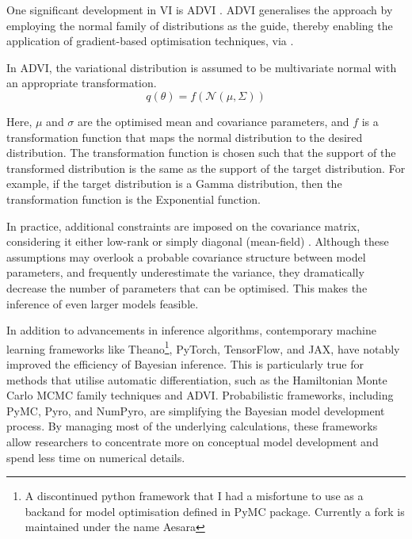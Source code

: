 One significant development in \ac{VI} is \ac{ADVI} \parencite{Kucukelbir2016-gn}. \ac{ADVI} generalises the approach by employing the normal family of distributions as the guide, thereby enabling the application of gradient-based optimisation techniques, via .

In \ac{ADVI}, the variational distribution is assumed to be multivariate normal with an appropriate transformation.
\begin{equation}
q(\theta) = f(\mathcal{N}(\mu, \Sigma))
\end{equation}

Here, $\mu$ and $\sigma$ are the optimised mean and covariance parameters, and $f$ is a transformation function that maps the normal distribution to the desired distribution. The transformation function is chosen such that the support of the transformed distribution is the same as the support of the target distribution. For example, if the target distribution is a Gamma distribution, then the transformation function is the Exponential function. 

In practice, additional constraints are imposed on the covariance matrix, considering it either low-rank or simply diagonal (mean-field) \parencite{Blei2017-dm}. Although these assumptions may overlook a probable covariance structure between model parameters, and frequently underestimate the variance, they dramatically decrease the number of parameters that can be optimised. This makes the inference of even larger models feasible.

In addition to advancements in inference algorithms, contemporary machine learning frameworks like \ac{Theano}\footnote{A discontinued python framework that I had a misfortune to use as a backand for model optimisation defined in PyMC package. Currently a fork is maintained under the name Aesara}, \ac{PyTorch}, \ac{TensorFlow}, and \ac{JAX}, have notably improved the efficiency of Bayesian inference. This is particularly true for methods that utilise automatic differentiation, such as the Hamiltonian Monte Carlo \ac{MCMC} family techniques and \ac{ADVI}. Probabilistic frameworks, including \ac{PyMC}, \ac{Pyro}, and \ac{NumPyro}, are simplifying the Bayesian model development process. By managing most of the underlying calculations, these frameworks allow researchers to concentrate more on conceptual model development and spend less time on numerical details.

